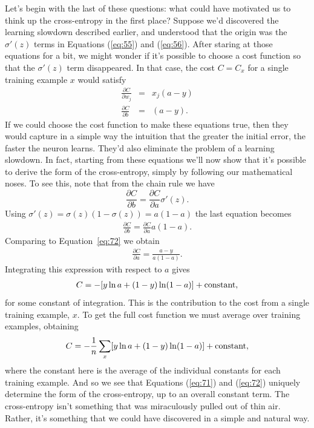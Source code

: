 \documentclass[a4paper,twoside,10pt]{book}
\begin{document}
Let's begin with the last of these questions: what could have motivated us to think up the cross-entropy in the first place? Suppose we'd discovered the learning slowdown described earlier, and understood that the origin was the $\sigma'(z)$ terms in Equations (\ref{eq:55}) and (\ref{eq:56}). After staring at those equations for a bit, we might wonder if it's possible to choose a cost function so that the $\sigma'(z)$ term disappeared. In that case, the cost $C=C_x$ for a single training example $x$ would satisfy
\begin{eqnarray} 
\frac{\partial C}{\partial w_j} & = & x_j(a-y) \label{eq:71}\\
\frac{\partial C}{\partial b } & = & (a-y).
\label{eq:72}\end{eqnarray}
If we could choose the cost function to make these equations true, then they would capture in a simple way the intuition that the greater the initial error, the faster the neuron learns. They'd also eliminate the problem of a learning slowdown. In fact, starting from these equations we'll now show that it's possible to derive the form of the cross-entropy, simply by following our mathematical noses. To see this, note that from the chain rule we have
\begin{equation}
	\frac{\partial C}{\partial b} = \frac{\partial C}{\partial a} \sigma'(z).
	\label{eq:73}
\end{equation}
Using $\sigma'(z)=\sigma(z)(1−\sigma(z))=a(1−a)$ the last equation becomes
\begin{eqnarray}
\frac{\partial C}{\partial b} = \frac{\partial C}{\partial a} 
a(1-a).
\label{eq:74}\end{eqnarray}
Comparing to Equation~\ref{eq:72} we obtain
\begin{eqnarray}
\frac{\partial C}{\partial a} = \frac{a-y}{a(1-a)}. \label{eq:75}\end{eqnarray}
Integrating this expression with respect to $a$ gives
\begin{eqnarray}
C = -[y \ln a + (1-y) \ln (1-a)]+ {\rm constant},
\label{eq:76}\end{eqnarray}
for some constant of integration. This is the contribution to the cost from a single training example, $x$. To get the full cost function we must average over training examples, obtaining
\begin{eqnarray}
C = -\frac{1}{n} \sum_x [y \ln a +(1-y) \ln(1-a)] + {\rm constant},
\label{eq:77}\end{eqnarray}
where the constant here is the average of the individual constants for each training example. And so we see that Equations (\ref{eq:71}) and (\ref{eq:72}) uniquely determine the form of the cross-entropy, up to an overall constant term. The cross-entropy isn't something that was miraculously pulled out of thin air. Rather, it's something that we could have discovered in a simple and natural way.
\end{document}
